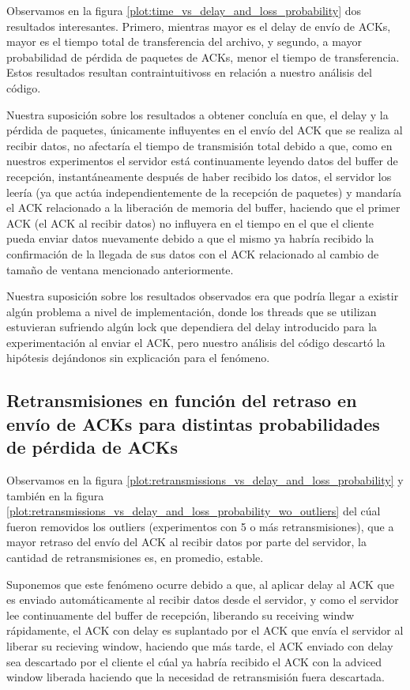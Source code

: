 \documentclass[a4paper, 10pt, twoside]{article}
\begin{document}
Observamos en la figura \ref{plot:time_vs_delay_and_loss_probability} dos resultados interesantes. Primero, mientras mayor es el delay de envío de ACKs, mayor es el tiempo total de transferencia del archivo, y segundo, a mayor probabilidad de pérdida de paquetes de ACKs, menor el tiempo de transferencia. Estos resultados resultan contraintuitivoss en relación a nuestro análisis del código. 

Nuestra suposición sobre los resultados a obtener concluía en que, el delay y la pérdida de paquetes, únicamente influyentes en el envío del ACK que se realiza al recibir datos, no afectaría el tiempo de transmisión total debido a que, como en nuestros experimentos el servidor está continuamente leyendo datos del buffer de recepción, instantáneamente después de haber recibido los datos, el servidor los leería (ya que actúa independientemente de la recepción de paquetes) y mandaría el ACK relacionado a la liberación de memoria del buffer, haciendo que el primer ACK (el ACK al recibir datos) no influyera en el tiempo en el que el cliente pueda enviar datos nuevamente debido a que el mismo ya habría recibido la confirmación de la llegada de sus datos con el ACK relacionado al cambio de tamaño de ventana mencionado anteriormente.

Nuestra suposición sobre los resultados observados era que podría llegar a existir algún problema a nivel de implementación, donde los threads que se utilizan estuvieran sufriendo algún lock que dependiera del delay introducido para la experimentación al enviar el ACK, pero nuestro análisis del código descartó la hipótesis dejándonos sin explicación para el fenómeno.


\subsection{Retransmisiones en función del retraso en envío de ACKs para distintas probabilidades de pérdida de ACKs} \label{sec:retr_vs_delay_and_loss}

Observamos en la figura \ref{plot:retransmissions_vs_delay_and_loss_probability} y también en la figura \ref{plot:retransmissions_vs_delay_and_loss_probability_wo_outliers} del cúal fueron removidos los outliers (experimentos con 5 o más retransmisiones), que a mayor retraso del envío del ACK al recibir datos por parte del servidor, la cantidad de retransmisiones es, en promedio, estable.

Suponemos que este fenómeno ocurre debido a que, al aplicar delay al ACK que es enviado automáticamente al recibir datos desde el servidor, y como el servidor lee continuamente del buffer de recepción, liberando su receiving windw rápidamente, el ACK con delay es suplantado por el ACK que envía el servidor al liberar su recieving window, haciendo que más tarde, el ACK enviado con delay sea descartado por el cliente el cúal ya habría recibido el ACK con la adviced window liberada haciendo que la necesidad de retransmisión fuera descartada.
\end{document}
